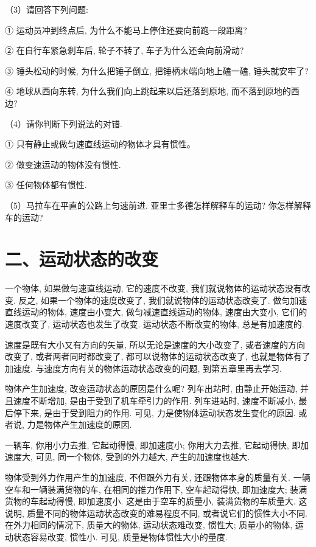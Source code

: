 \documentclass[10pt]{article}
\begin{document}
（3）请回答下列问题:

① 运动员冲到终点后, 为什么不能马上停住还要向前跑一段距离?

② 在自行车紧急刹车后, 轮子不转了, 车子为什么还会向前滑动?

③ 锤头松动的时候, 为什么把锤子倒立, 把锤柄末端向地上磕一磕, 锤头就安牢了?

④ 地球从西向东转, 为什么我们向上跳起来以后还落到原地, 而不落到原地的西边?

（4）请你判断下列说法的对错.

① 只有静止或做匀速直线运动的物体才具有惯性。

② 做变速运动的物体没有惯性.

③ 任何物体都有惯性.

（5）马拉车在平直的公路上匀速前进. 亚里士多德怎样解释车的运动? 你怎样解释车的运动?

\section*{二、运动状态的改变}

一个物体, 如果做匀速直线运动, 它的速度不改变, 我们就说物体的运动状态没有改变. 反之, 如果一个物体的速度改变了, 我们就说物体的运动状态改变了. 做匀加速直线运动的物体, 速度由小变大, 做匀减速直线运动的物体, 速度由大变小, 它们的速度改变了, 运动状态也发生了改变. 运动状态不断改变的物体, 总是有加速度的.

速度是既有大小又有方向的矢量, 所以无论是速度的大小改变了, 或者速度的方向改变了, 或者两者同时都改变了, 都可以说物体的运动状态改变了, 也就是物体有了加速度. 与速度方向有关的物体运动状态改变的问题, 到第五章里再去学习.

物体产生加速度, 改变运动状态的原因是什么呢? 列车出站时, 由静止开始运动, 并且速度不断增加, 是由于受到了机车牵引力的作用. 列车进站时, 速度不断减小, 最后停下来, 是由于受到阻力的作用. 可见, 力是使物体运动状态发生变化的原因. 或者说, 力是物体产生加速度的原因.

一辆车, 你用小力去推, 它起动得慢, 即加速度小; 你用大力去推, 它起动得快, 即加速度大, 可见, 同一个物体, 受到的外力越大, 产生的加速度也越大.

物体受到外力作用产生的加速度, 不但跟外力有关, 还跟物体本身的质量有关. 一辆空车和一辆装满货物的车, 在相同的推力作用下, 空车起动得快, 即加速度大; 装满货物的车起动得慢, 即加速度小. 这是由于空车的质量小, 装满货物的车质量大. 这说明, 质量不同的物体运动状态改变的难易程度不同, 或者说它们的惯性大小不同. 在外力相同的情况下, 质量大的物体, 运动状态难改变, 惯性大; 质量小的物体, 运动状态容易改变, 惯性小. 可见, 质量是物体惯性大小的量度.
\end{document}
